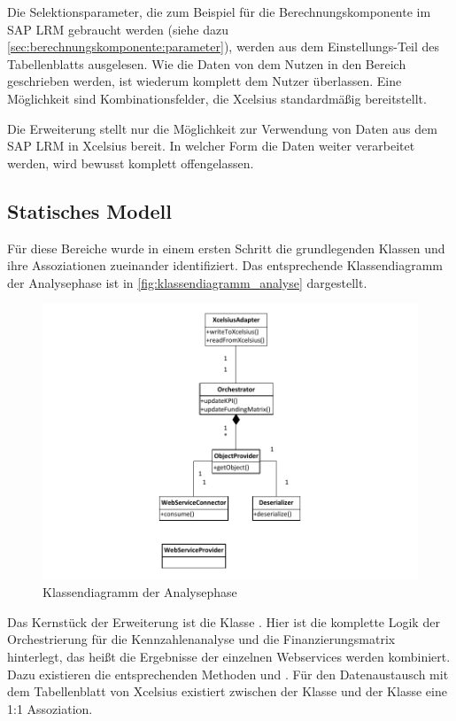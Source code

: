 \begin{onehalfspacing}
Die Selektionsparameter, die zum Beispiel für die Berechnungskomponente im SAP LRM gebraucht werden (siehe dazu \vref{sec:berechnungskomponente:parameter}), werden aus dem Einstellungs-Teil des Tabellenblatts ausgelesen. Wie die Daten von dem Nutzen in den Bereich geschrieben werden, ist wiederum komplett dem Nutzer überlassen. Eine Möglichkeit sind Kombinationsfelder, die Xcelsius standardmäßig bereitstellt.

Die Erweiterung stellt nur die Möglichkeit zur Verwendung von Daten aus dem SAP LRM in Xcelsius bereit. In welcher Form die Daten weiter verarbeitet werden, wird bewusst komplett offengelassen.

\subsection{Statisches Modell}
Für diese Bereiche wurde in einem ersten Schritt die grundlegenden Klassen und ihre Assoziationen zueinander identifiziert. Das entsprechende Klassendiagramm der Analysephase ist in \vref{fig:klassendiagramm_analyse} dargestellt.

\begin{figure}[h]
\centering
\setlength{\unitlength}{1mm}
\includegraphics[width=15cm]{Visio/Analyse.pdf}
\caption{Klassendiagramm der Analysephase \label{fig:klassendiagramm_analyse}}
\end{figure}

Das Kernstück der Erweiterung ist die Klasse . Hier ist die komplette Logik der Orchestrierung für die Kennzahlenanalyse und die Finanzierungsmatrix hinterlegt, das heißt die Ergebnisse der einzelnen Webservices werden kombiniert. Dazu existieren die entsprechenden Methoden  und . Für den Datenaustausch mit dem Tabellenblatt von Xcelsius existiert zwischen der Klasse  und der Klasse  eine 1:1 Assoziation.


\end{onehalfspacing}
